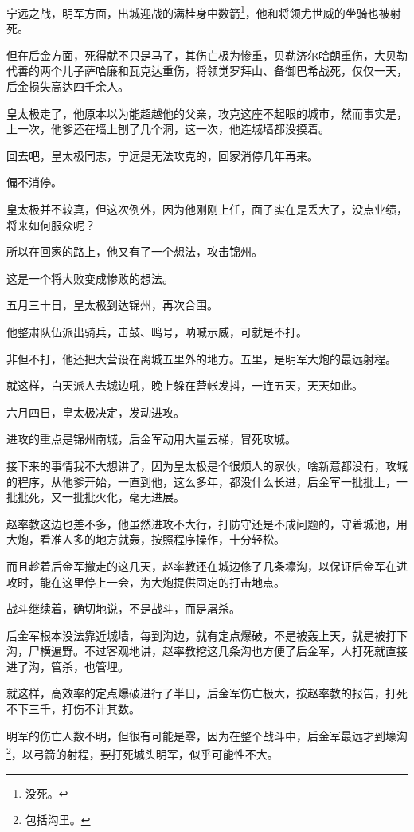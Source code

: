 \begin{multicols}{\theparacolNo}
宁远之战，明军方面，出城迎战的满桂身中数箭\footnote{没死。}，他和将领尤世威的坐骑也被射死。

但在后金方面，死得就不只是马了，其伤亡极为惨重，贝勒济尔哈朗重伤，大贝勒代善的两个儿子萨哈廉和瓦克达重伤，将领觉罗拜山、备御巴希战死，仅仅一天，后金损失高达四千余人。

皇太极走了，他原本以为能超越他的父亲，攻克这座不起眼的城市，然而事实是，上一次，他爹还在墙上刨了几个洞，这一次，他连城墙都没摸着。

回去吧，皇太极同志，宁远是无法攻克的，回家消停几年再来。

偏不消停。

皇太极并不较真，但这次例外，因为他刚刚上任，面子实在是丢大了，没点业绩，将来如何服众呢？

所以在回家的路上，他又有了一个想法，攻击锦州。

这是一个将大败变成惨败的想法。

五月三十日，皇太极到达锦州，再次合围。

他整肃队伍派出骑兵，击鼓、鸣号，呐喊示威，可就是不打。

非但不打，他还把大营设在离城五里外的地方。五里，是明军大炮的最远射程。

就这样，白天派人去城边吼，晚上躲在营帐发抖，一连五天，天天如此。

六月四日，皇太极决定，发动进攻。

进攻的重点是锦州南城，后金军动用大量云梯，冒死攻城。

接下来的事情我不大想讲了，因为皇太极是个很烦人的家伙，啥新意都没有，攻城的程序，从他爹开始，一直到他，这么多年，都没什么长进，后金军一批批上，一批批死，又一批批火化，毫无进展。

赵率教这边也差不多，他虽然进攻不大行，打防守还是不成问题的，守着城池，用大炮，看准人多的地方就轰，按照程序操作，十分轻松。

而且趁着后金军撤走的这几天，赵率教还在城边修了几条壕沟，以保证后金军在进攻时，能在这里停上一会，为大炮提供固定的打击地点。

战斗继续着，确切地说，不是战斗，而是屠杀。

后金军根本没法靠近城墙，每到沟边，就有定点爆破，不是被轰上天，就是被打下沟，尸横遍野。不过客观地讲，赵率教挖这几条沟也方便了后金军，人打死就直接进了沟，管杀，也管埋。

就这样，高效率的定点爆破进行了半日，后金军伤亡极大，按赵率教的报告，打死不下三千，打伤不计其数。

明军的伤亡人数不明，但很有可能是零，因为在整个战斗中，后金军最远才到壕沟\footnote{包括沟里。}，以弓箭的射程，要打死城头明军，似乎可能性不大。


\end{multicols}
